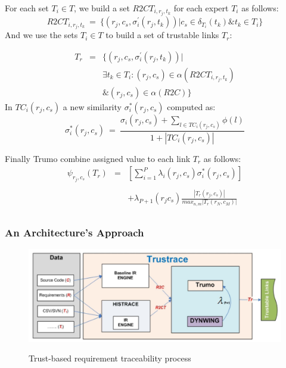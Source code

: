 \documentclass[12pt,hyperref=true,mathserif]{beamer}
\begin{document}
\begin{frame}
For each set $T_{i}\in T$, we build a set $R2CT_{i,r_{j},t_{k}}$ for each expert $T_{i}$ as follows:
\begin{equation}\label{equ:RequirementSetforExperts}
  R2CT_{i,r_{j},t_{k}}~=~\{(r_{j},c_{s},\sigma^{'}_{i}(r_{j},t_{k}))|c_{s}\in \delta_{T_{i}}(t_{k}) \& t_{k}\in T_{i}\}
\end{equation}
And we use the sets $T_{i} \in T$ to build a set of trustable links $T_{r}$:

\begin{equation}
    \begin{array}{rcl}
        T_{r} & = & \{(r_{j},c_{s},\sigma^{'}_{i}(r_{j},t_{k}))|\\
                  &  & \exists t_{k} \in T_{i}:(r_{j},c_{s})\in \alpha(R2CT_{i,r_{j},t_{k}})\\
                  &  & \&(r_{j},c_{s}) \in \alpha(R2C)\}
    \end{array}
\end{equation}
In $TC_{i}(r_{j},c_{s})$ a new similarity $\sigma^{*}_{i}(r_{j},c_{s})$ computed as:
\begin{equation}\label{equ:TrumoNewSimilarity}
  \sigma^{*}_{i}(r_{j},c_{s})~=~\frac{\sigma_{i}(r_{j},c_{s})+\sum_{l\in TC_{i}(r_{j},c_{s})}\phi(l)}{1+|TC_{i}(r_{j},c_{s})|}
\end{equation}
\end{frame}

\begin{frame}
Finally Trumo combine assigned value  to each link $T_{r}$ as follows:
\begin{equation}
    \begin{array}{rcl}
        \psi_{r_{j},c_{s}}(T_{r}) & = & [\sum_{i=1}^{P}\lambda_{i}(r_{j},c_{s})\sigma^{*}_{i}(r_{j},c_{s})]\\
        &  &  \\
                  &  & +\lambda_{P+1}(r_{j}c_{s}) \frac{|T_{r}(r_{j},c_{s})|}{max_{n,m}|T_{r}(r_{N},c_{M})|}\\

    \end{array}
\end{equation}
\end{frame}

\begin{frame}
\frametitle{An Architecture's Approach}
\begin{figure}
  \centering
  \includegraphics[scale=0.2]{Traceability}\\
  \caption{Trust-based requirement traceability process}\label{fig:Traceability}
\end{figure}
\end{frame}
\end{document}
